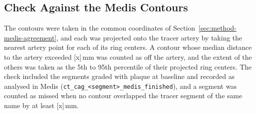 \subsection{Check Against the Medis Contours}
\label{sec:app-split-check}

The contours were taken in the common coordinates of Section~\ref{sec:method-medis-agreement}, and each was projected onto the tracer artery by taking the nearest artery point for each of its ring centers.
A contour whose median distance to the artery exceeded [x]\,mm was counted as off the artery, and the extent of the others was taken as the 5th to 95th percentile of their projected ring centers.
The check included the segments graded with plaque at baseline and recorded as analysed in Medis (\texttt{ct\_cag\_<segment>\_medis\_finished}), and a segment was counted as missed when no contour overlapped the tracer segment of the same name by at least [x]\,mm.
